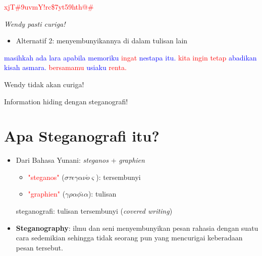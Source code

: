 \documentclass{article}
\begin{document}
\vspace{5mm}

\textcolor{red}{xjT\#9uvmY!rc\$7yt59hth@\#}

\vspace{5mm}

\textit{Wendy pasti curiga!}

\newpage


\begin{itemize}
  \item Alternatif 2: menyembunyikannya di dalam tulisan lain
\end{itemize}

\textcolor{blue}{masihkah} \textcolor{blue}{ada} \textcolor{blue}{lara} \textcolor{blue}{apabila} \textcolor{blue}{memoriku} \textcolor{red}{ingat} \textcolor{blue}{nestapa} \textcolor{blue}{itu.} \textcolor{red}{kita} \textcolor{red}{ingin} \textcolor{red}{tetap}
\textcolor{blue}{abadikan} \textcolor{blue}{kisah} \textcolor{blue}{asmara.} \textcolor{red}{bersamamu} \textcolor{blue}{usiaku} \textcolor{red}{renta.}

\vspace{5mm}

Wendy tidak akan curiga!

\vspace{5mm}

Information hiding dengan steganografi!

\newpage


\section*{Apa Steganografi itu?}

\begin{itemize}
    \item Dari Bahasa Yunani: \textit{steganos} + \textit{graphien}
    \begin{itemize}
        \item \textcolor{red}{"steganos"} ($\sigma\tau\epsilon\gamma\alpha\nu\acute{o}\varsigma$): tersembunyi
        \item \textcolor{red}{"graphien"} ($\gamma\rho\alpha\phi\acute{\iota}\alpha$): tulisan
    \end{itemize}
    steganografi: tulisan tersembunyi (\textit{covered writing})
    
    \item \textbf{Steganography}: ilmu dan seni menyembunyikan pesan rahasia dengan suatu cara sedemikian sehingga tidak seorang pun yang mencurigai keberadaan pesan tersebut.
\end{itemize}
\end{document}
